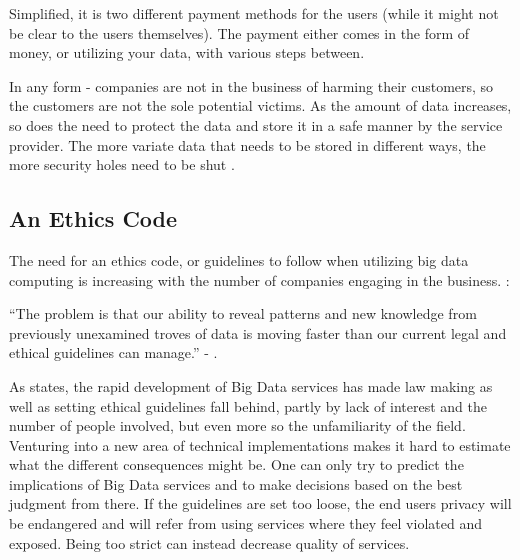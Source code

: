 Simplified, it is two different payment methods for the users (while 
it might not be clear to the users themselves). The payment either comes
in the form of money, or utilizing your data, with various steps 
between. 

In any form - companies are not in the business of harming their customers,
so the customers are not the sole potential victims. As the amount of 
data increases, so does the need to protect the data and store it in a 
safe manner by the service provider. The more variate data that needs
to be stored in different ways, the more security holes need to be shut 
\cite{ethics-of-big-data}.

\subsection{An Ethics Code}

The need for an ethics code, or guidelines to follow when utilizing big data
computing is increasing with the number of companies engaging in the business.
\citeauthor{whats-up-with-big-data-ethics}:
\begin{displayquote}
    ``The problem is that our ability to reveal patterns and new 
    knowledge from previously unexamined troves of data is moving 
    faster than our current legal and ethical guidelines can manage.''
    -  
    \cite{whats-up-with-big-data-ethics}.
\end{displayquote}

As \citeauthor{whats-up-with-big-data-ethics} states, the rapid development 
of Big Data services
has made law making as well as setting ethical guidelines fall behind, 
partly by lack of interest and the number of people involved, 
but even more so the unfamiliarity of the field. Venturing into a new 
area of technical implementations makes it hard to estimate what the 
different consequences might be. One can only try to predict the 
implications of Big Data services and to make decisions based on the
best judgment from there. If the guidelines are set too loose, the 
end users privacy will be endangered and will refer from using services
where they feel violated and exposed. Being too strict can instead
decrease quality of services.

